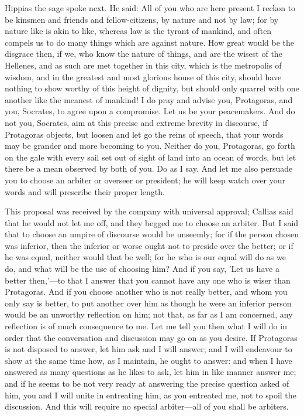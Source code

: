 \documentclass[11pt,letter]{article}
\begin{document}
\par  Hippias the sage spoke next. He said: All of you who are here present I reckon to be kinsmen and friends and fellow-citizens, by nature and not by law; for by nature like is akin to like, whereas law is the tyrant of mankind, and often compels us to do many things which are against nature. How great would be the disgrace then, if we, who know the nature of things, and are the wisest of the Hellenes, and as such are met together in this city, which is the metropolis of wisdom, and in the greatest and most glorious house of this city, should have nothing to show worthy of this height of dignity, but should only quarrel with one another like the meanest of mankind! I do pray and advise you, Protagoras, and you, Socrates, to agree upon a compromise. Let us be your peacemakers. And do not you, Socrates, aim at this precise and extreme brevity in discourse, if Protagoras objects, but loosen and let go the reins of speech, that your words may be grander and more becoming to you. Neither do you, Protagoras, go forth on the gale with every sail set out of sight of land into an ocean of words, but let there be a mean observed by both of you. Do as I say. And let me also persuade you to choose an arbiter or overseer or president; he will keep watch over your words and will prescribe their proper length.

\par  This proposal was received by the company with universal approval; Callias said that he would not let me off, and they begged me to choose an arbiter. But I said that to choose an umpire of discourse would be unseemly; for if the person chosen was inferior, then the inferior or worse ought not to preside over the better; or if he was equal, neither would that be well; for he who is our equal will do as we do, and what will be the use of choosing him? And if you say, 'Let us have a better then,'—to that I answer that you cannot have any one who is wiser than Protagoras. And if you choose another who is not really better, and whom you only say is better, to put another over him as though he were an inferior person would be an unworthy reflection on him; not that, as far as I am concerned, any reflection is of much consequence to me. Let me tell you then what I will do in order that the conversation and discussion may go on as you desire. If Protagoras is not disposed to answer, let him ask and I will answer; and I will endeavour to show at the same time how, as I maintain, he ought to answer: and when I have answered as many questions as he likes to ask, let him in like manner answer me; and if he seems to be not very ready at answering the precise question asked of him, you and I will unite in entreating him, as you entreated me, not to spoil the discussion. And this will require no special arbiter—all of you shall be arbiters.
\end{document}
